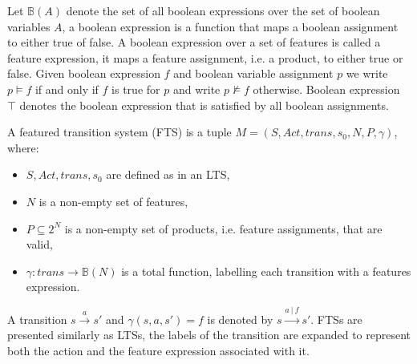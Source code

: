 Let $\mathbb{B}(A)$ denote the set of all boolean expressions over the set of boolean variables $A$, a boolean expression is a function that maps a boolean assignment to either true of false. A boolean expression over a set of features is called a feature expression, it maps a feature assignment, i.e. a product, to either true or false. Given boolean expression $f$ and boolean variable assignment $p$ we write $p \models f$ if and only if $f$ is true for $p$ and write $p \not\models f$ otherwise. Boolean expression $\top$ denotes the boolean expression that is satisfied by all boolean assignments.
\begin{definition}
	\label{def_fts} A featured transition system (FTS) is a tuple $M = (S, Act, trans, s_0, N, P, \gamma)$, where:
	\begin{itemize}
		\item $S, Act, trans, s_0$ are defined as in an LTS,
		\item $N$ is a non-empty set of features,
		\item $P \subseteq 2^N$ is a non-empty set of products, i.e. feature assignments, that are valid,
		\item $\gamma : trans \rightarrow \mathbb{B}(N)$ is a total function, labelling each transition with a features expression.
	\end{itemize}
\end{definition}
A transition $s \xrightarrow a s'$ and $\gamma(s,a,s') = f$ is denoted by $s \xrightarrow {a\ |\ f} s'$. FTSs are presented similarly as LTSs, the labels of the transition are expanded to represent both the action and the feature expression associated with it.

